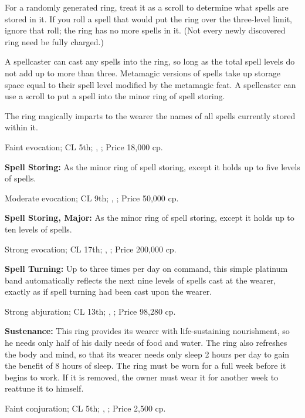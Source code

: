 For a randomly generated ring, treat it as a scroll to determine what spells are stored in it. If you roll a spell that would put the ring over the three-level limit, ignore that roll; the ring has no more spells in it. (Not every newly discovered ring need be fully charged.)

A spellcaster can cast any spells into the ring, so long as the total spell levels do not add up to more than three. Metamagic versions of spells take up storage space equal to their spell level modified by the metamagic feat. A spellcaster can use a scroll to put a spell into the minor ring of spell storing.

The ring magically imparts to the wearer the names of all spells currently stored within it.

Faint evocation; CL 5th; , ; Price 18,000 cp.

\textbf{Spell Storing:} As the minor ring of spell storing, except it holds up to five levels of spells.

Moderate evocation; CL 9th; , ; Price 50,000 cp.

\textbf{Spell Storing, Major:} As the minor ring of spell storing, except it holds up to ten levels of spells.

Strong evocation; CL 17th; , ; Price 200,000 cp.

\textbf{Spell Turning:} Up to three times per day on command, this simple platinum band automatically reflects the next nine levels of spells cast at the wearer, exactly as if spell turning had been cast upon the wearer.

Strong abjuration; CL 13th; , ; Price 98,280 cp.

\textbf{Sustenance:} This ring provides its wearer with life-sustaining nourishment, so he needs only half of his daily needs of food and water. The ring also refreshes the body and mind, so that its wearer needs only sleep 2 hours per day to gain the benefit of 8 hours of sleep. The ring must be worn for a full week before it begins to work. If it is removed, the owner must wear it for another week to reattune it to himself.

Faint conjuration; CL 5th; , ; Price 2,500 cp.


